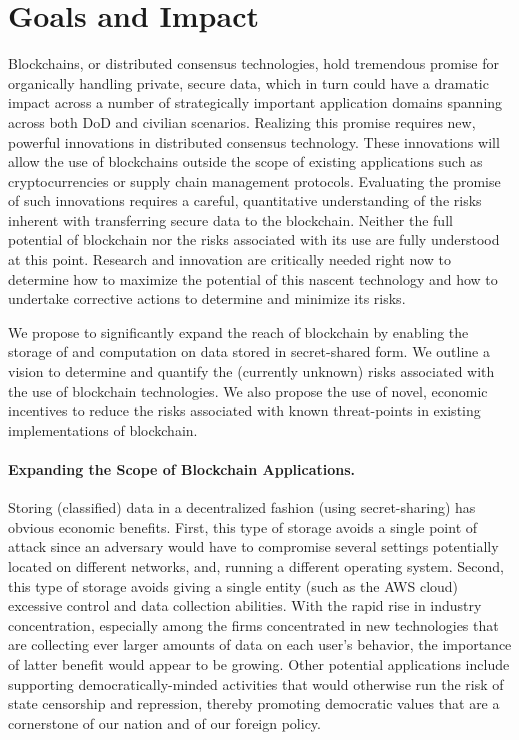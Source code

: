 \documentclass[runningheads, 12pt]{article}
\begin{document}



\section{Goals and Impact}

Blockchains, or distributed consensus technologies, hold tremendous promise for organically handling private, secure data, which in turn could have a dramatic impact across a number of strategically important application domains spanning across both DoD and civilian scenarios. Realizing this promise requires new, powerful innovations in distributed consensus technology. These innovations will allow the use of blockchains outside the scope of existing applications such as cryptocurrencies or supply chain management protocols. Evaluating the promise of such innovations requires a careful, quantitative understanding of the risks inherent with transferring secure data to the blockchain. Neither the full potential of blockchain nor the risks associated with its use are fully understood at this point. Research and innovation are critically needed right now to determine how to maximize the potential of this nascent technology and how to undertake corrective actions to determine and minimize its risks.

We propose to significantly expand the reach of blockchain by enabling the storage of and computation on data stored in secret-shared form. We outline a vision to determine and quantify the (currently unknown) risks associated with the use of blockchain technologies. We also propose the use of novel, economic incentives to reduce the risks associated with known threat-points in existing implementations of blockchain.


\paragraph{Expanding the Scope of Blockchain Applications.} Storing (classified) data in a decentralized fashion (using secret-sharing) has obvious economic benefits. First, this type of storage avoids a single point of attack since an adversary would have to compromise several settings potentially located on different networks, and, running a different operating system. Second, this type of storage avoids giving a single entity (such as the AWS cloud) excessive control and data collection abilities. With the rapid rise in industry concentration, especially among the firms concentrated in new technologies that are collecting ever larger amounts of data on each user's behavior, the importance of latter benefit would appear to be growing. Other potential applications include supporting democratically-minded activities that would otherwise run the risk of state censorship and repression, thereby promoting democratic values that are a cornerstone of our nation and of our foreign policy.
\end{document}
